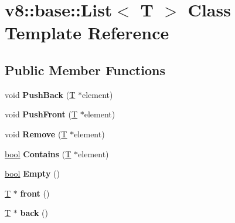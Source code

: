 \hypertarget{classv8_1_1base_1_1List}{}\section{v8\+:\+:base\+:\+:List$<$ T $>$ Class Template Reference}
\label{classv8_1_1base_1_1List}
\subsection*{Public Member Functions}
\begin{DoxyCompactItemize}
\item 
\mbox{\label{classv8_1_1base_1_1List_aafef75be28520809e5552af57e0b473a}} 
void {\bfseries Push\+Back} (\mbox{\hyperlink{classv8_1_1internal_1_1torque_1_1T}{T}} $\ast$element)
\item 
\mbox{\label{classv8_1_1base_1_1List_a412da2b17ff0fcfa10f8e0a8315e93f5}} 
void {\bfseries Push\+Front} (\mbox{\hyperlink{classv8_1_1internal_1_1torque_1_1T}{T}} $\ast$element)
\item 
\mbox{\label{classv8_1_1base_1_1List_a371e4d125cebcab98b494feaf0ffb27e}} 
void {\bfseries Remove} (\mbox{\hyperlink{classv8_1_1internal_1_1torque_1_1T}{T}} $\ast$element)
\item 
\mbox{\label{classv8_1_1base_1_1List_af4d6e90293d2beff1f7b66863a0de35a}} 
\mbox{\hyperlink{classbool}{bool}} {\bfseries Contains} (\mbox{\hyperlink{classv8_1_1internal_1_1torque_1_1T}{T}} $\ast$element)
\item 
\mbox{\label{classv8_1_1base_1_1List_ac68d358c765e05dd0067e3eda1ff29c5}} 
\mbox{\hyperlink{classbool}{bool}} {\bfseries Empty} ()
\item 
\mbox{\label{classv8_1_1base_1_1List_a60aa43dba4f3dc6d2a76d6e8ad0c6cc3}} 
\mbox{\hyperlink{classv8_1_1internal_1_1torque_1_1T}{T}} $\ast$ {\bfseries front} ()
\item 
\mbox{\label{classv8_1_1base_1_1List_a61f1f6f31ed181c192c280c3fd11c507}} 
\mbox{\hyperlink{classv8_1_1internal_1_1torque_1_1T}{T}} $\ast$ {\bfseries back} ()
\end{DoxyCompactItemize}


